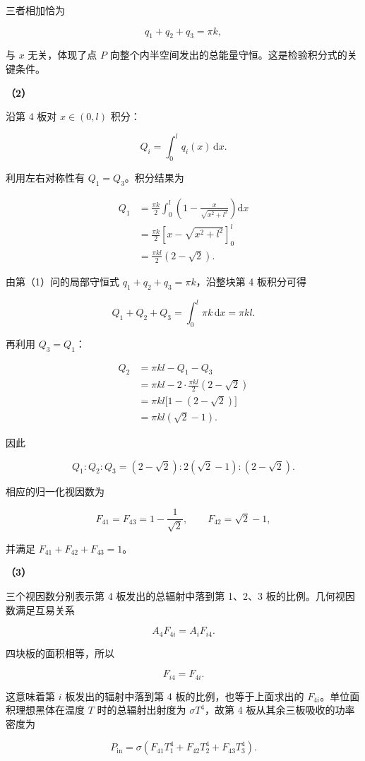 \documentclass[12pt,a4paper,UTF8]{ctexart}
\begin{document}
三者相加恰为

\[q_1+q_2+q_3=\pi k,\]

与 \(x\) 无关，体现了点 \(P\)
向整个内半空间发出的总能量守恒。这是检验积分式的关键条件。

\textbf{（2）}

沿第 4 板对 \(x\in(0,l)\) 积分：

\[Q_i=\int_0^lq_i(x)\,\mathrm dx.\]

利用左右对称性有 \(Q_1=Q_3\)。积分结果为

\[\begin{aligned}
Q_1
&=\frac{\pi k}{2}
\int_0^l\left(1-\frac{x}{\sqrt{x^2+l^2}}\right)\mathrm dx\\
&=\frac{\pi k}{2}
\left[x-\sqrt{x^2+l^2}\right]_{0}^{l}\\
&=\frac{\pi kl}{2}(2-\sqrt2).
\end{aligned}\]

由第（1）问的局部守恒式 \(q_1+q_2+q_3=\pi k\)，沿整块第 4 板积分可得

\[Q_1+Q_2+Q_3
=\int_0^l\pi k\,\mathrm dx
=\pi kl.\]

再利用 \(Q_3=Q_1\)：

\[\begin{aligned}
Q_2
&=\pi kl-Q_1-Q_3\\
&=\pi kl-2\cdot\frac{\pi kl}{2}(2-\sqrt2)\\
&=\pi kl\bigl[1-(2-\sqrt2)\bigr]\\
&=\pi kl(\sqrt2-1).
\end{aligned}\]

因此

\[\boxed{
Q_1:Q_2:Q_3
=(2-\sqrt2):2(\sqrt2-1):(2-\sqrt2)
}.\]

相应的归一化视因数为

\[F_{41}=F_{43}=1-\frac1{\sqrt2},\qquad
F_{42}=\sqrt2-1,\]

并满足 \(F_{41}+F_{42}+F_{43}=1\)。

\textbf{（3）}

三个视因数分别表示第 4 板发出的总辐射中落到第 1、2、3
板的比例。几何视因数满足互易关系

\[A_4F_{4i}=A_iF_{i4}.\]

四块板的面积相等，所以

\[F_{i4}=F_{4i}.\]

这意味着第 \(i\) 板发出的辐射中落到第 4 板的比例，也等于上面求出的
\(F_{4i}\)。单位面积理想黑体在温度 \(T\) 时的总辐射出射度为
\(\sigma T^4\)，故第 4 板从其余三板吸收的功率密度为

\[P_{\mathrm{in}}
=\sigma\left(F_{41}T_1^4+F_{42}T_2^4+F_{43}T_3^4\right).\]
\end{document}
